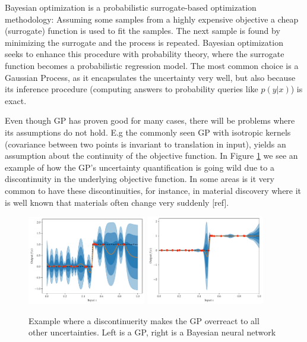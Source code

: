 Bayesian optimization is a probabilistic surrogate-based optimization methodology: Assuming some samples from a
highly expensive objective a cheap (surrogate) function is used to fit the samples. The next sample
is found by minimizing the surrogate and the process is repeated. Bayesian optimization seeks to
enhance this procedure with probability theory, where the surrogate function becomes a probabilistic
regression model. The most common choice is a Gaussian Process, as it encapsulates the uncertainty very well,
but also because its inference procedure (computing answers to probability queries like $p(y|x)$) is exact.


Even though GP has proven good for many cases, there will be problems where its assumptions do not
hold. E.g the commonly seen GP with isotropic kernels (covariance between two points is invariant to
translation in input), yields an assumption about the continuity of the objective function. In Figure
\ref{fig:GP_vs_BNN} we see an example of how the GP's uncertainty quantification is going wild due
to a discontinuity in the underlying objective function. In some areas is it very common to have
these discontinuities, for instance, in material discovery where it is well known that materials often
change very suddenly [ref]. 

\begin{figure}[H]%
    \label{fig:GP_vs_BNN}
    \centering
    {\includegraphics[width=0.46\textwidth]{Pictures/GP_vs_BNN1.pdf} }%
    \qquad
   {\includegraphics[width=0.46\textwidth]{Pictures/GP_vs_BNN2.pdf} }%
    \caption{Example where a discontinuerity makes the GP overreact to all other 
    uncertainties. Left is a GP, right is a Bayesian neural network}%
\end{figure}

